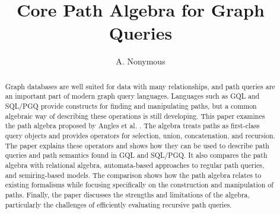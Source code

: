 \documentclass[runningheads]{llncs}
\begin{document}
%
%
\title{Core Path Algebra for Graph Queries}
%
%
\author{A. Nonymous}
%
%
%
\maketitle              %
%

\begin{abstract}
Graph databases are well suited for data with many relationships, and path queries are an important part of modern graph query languages. Languages such as GQL and SQL/PGQ provide constructs for finding and manipulating paths, but a common algebraic way of describing these operations is still developing. This paper examines the path algebra proposed by Angles et al. \cite{angles2024path}. The algebra treats paths as first-class query objects and provides operators for selection, union, concatenation, and recursion. The paper explains these operators and shows how they can be used to describe path queries and path semantics found in GQL and SQL/PGQ. It also compares the path algebra with relational algebra, automata-based approaches to regular path queries, and semiring-based models. The comparison shows how the path algebra relates to existing formalisms while focusing specifically on the construction and manipulation of paths. Finally, the paper discusses the strengths and limitations of the algebra, particularly the challenges of efficiently evaluating recursive path queries.


\end{abstract}

%
%

\tableofcontents
\newpage









\end{document}
